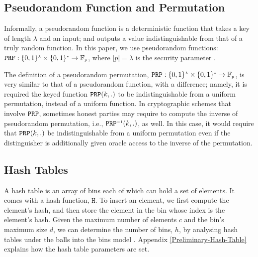 %

\vs
\vs
\subsection{Pseudorandom Function and Permutation}
\svs

Informally, a pseudorandom function is a deterministic function that takes a key of length $\lambda$ and an input; and outputs a value  indistinguishable from that of  a truly random function.  In this paper, we use pseudorandom functions:   $\mathtt {PRF}: \{0,1\}^{\scriptscriptstyle \lambda}\times \{0,1\}^{\scriptscriptstyle *} \rightarrow  \mathbb{F}_{\scriptscriptstyle p}$, where $|p|=\lambda$ is the security parameter \cite{DBLP:books/crc/KatzLindell2007}. 


The definition of a pseudorandom permutation, $\mathtt {PRP}: \{0,1\}^{\scriptscriptstyle \lambda}\times \{0,1\}^{\scriptscriptstyle *} \rightarrow  \mathbb{F}_{\scriptscriptstyle p}$, is very similar to that of a pseudorandom function, with a difference; namely, it is required the keyed function $\mathtt{PRP}(k,.)$ to be indistinguishable from a uniform permutation, instead of a uniform function. In cryptographic schemes that involve $\mathtt{PRP}$, sometimes honest parties may require to compute the inverse of pseudorandom permutation, i.e., $\mathtt {PRP}^{\scriptscriptstyle -1}(k, .)$, as well. In this case, it would require that $\mathtt{PRP}(k,.)$ be indistinguishable from a uniform permutation even if the distinguisher is additionally given oracle access to the inverse of the permutation. 


\vs



\vs
\vs
\subsection{Hash Tables}

\svs

A hash table is an array of  bins each of which can hold a set of elements. It comes with a hash function, $\mathtt{H}$. To insert an element, we first compute the element's hash,  and then store the element in the bin whose index is the element's hash. Given the maximum number of elements $c$ and the bin's maximum size $d$, we can determine the number of bins, $h$, by analysing hash tables under the balls into the bins model  \cite{DBLP:conf/stoc/BerenbrinkCSV00}. Appendix \ref{Preliminary-Hash-Table} explains how the hash table parameters are set.

